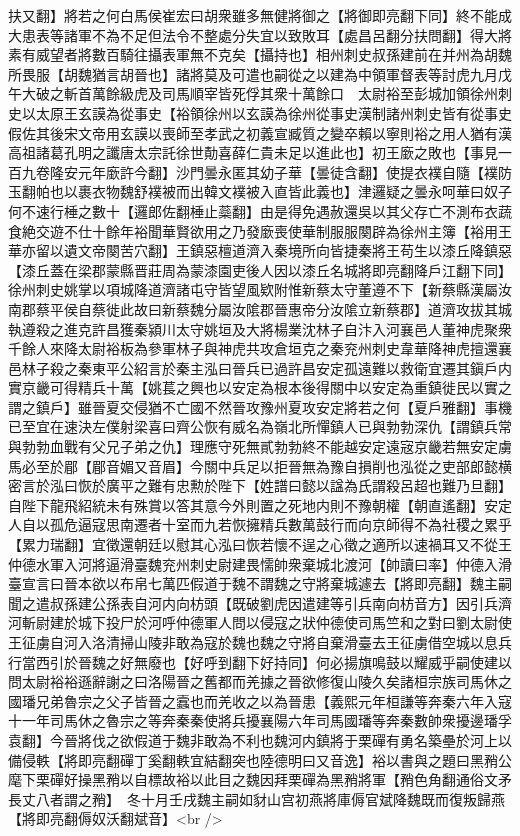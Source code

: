 扶又翻】將若之何白馬侯崔宏曰胡衆雖多無健將御之【將御即亮翻下同】終不能成大患表等諸軍不為不足但法令不整處分失宜以致敗耳【處昌呂翻分扶問翻】得大將素有威望者將數百騎往攝表軍無不克矣【攝持也】相州刺史叔孫建前在并州為胡魏所畏服【胡魏猶言胡晉也】諸將莫及可遣也嗣從之以建為中領軍督表等討虎九月戊午大破之斬首萬餘級虎及司馬順宰皆死俘其衆十萬餘口　太尉裕至彭城加領徐州刺史以太原王玄謨為從事史【裕領徐州以玄謨為徐州從事史漢制諸州刺史皆有從事史假佐其後宋文帝用玄謨以喪師至孝武之初義宣臧質之變卒賴以寧則裕之用人猶有漢高祖諸葛孔明之讖唐太宗託徐世勣喜薛仁貴未足以進此也】初王廞之敗也【事見一百九卷隆安元年廞許今翻】沙門曇永匿其幼子華【曇徒含翻】使提衣襆自隨【襆防玉翻帕也以裹衣物魏舒襆被而出韓文襆被入直皆此義也】津邏疑之曇永呵華曰奴子何不速行棰之數十【邏郎佐翻棰止蘂翻】由是得免遇赦還吳以其父存亡不測布衣蔬食絶交遊不仕十餘年裕聞華賢欲用之乃發廞喪使華制服服闋辟為徐州主簿【裕用王華亦留以遺文帝闋苦穴翻】王鎮惡檀道濟入秦境所向皆捷秦將王苟生以漆丘降鎮惡【漆丘蓋在梁郡蒙縣晋莊周為蒙漆園吏後人因以漆丘名城將即亮翻降戶江翻下同】徐州刺史姚掌以項城降道濟諸屯守皆望風欵附惟新蔡太守董遵不下【新蔡縣漢屬汝南郡蔡平侯自蔡徙此故曰新蔡魏分屬汝隂郡晉惠帝分汝隂立新蔡郡】道濟攻拔其城執遵殺之進克許昌獲秦潁川太守姚垣及大將楊業沈林子自汴入河襄邑人董神虎聚衆千餘人來降太尉裕板為參軍林子與神虎共攻倉垣克之秦兖州刺史韋華降神虎擅還襄邑林子殺之秦東平公紹言於秦主泓曰晉兵已過許昌安定孤遠難以救衛宜遷其鎭戶内實京畿可得精兵十萬【姚萇之興也以安定為根本後得關中以安定為重鎮徙民以實之謂之鎮戶】雖晉夏交侵猶不亡國不然晉攻豫州夏攻安定將若之何【夏戶雅翻】事機已至宜在速決左僕射梁喜曰齊公恢有威名為嶺北所憚鎮人已與勃勃深仇【謂鎮兵常與勃勃血戰有父兄子弟之仇】理應守死無貳勃勃終不能越安定遠宼京畿若無安定虜馬必至於郿【郿音媚又音眉】今關中兵足以拒晉無為豫自損削也泓從之吏部郎懿横密言於泓曰恢於廣平之難有忠勲於陛下【姓譜曰懿以諡為氏謂殺呂超也難乃旦翻】自陛下龍飛紹統未有殊賞以答其意今外則置之死地内則不豫朝權【朝直遙翻】安定人自以孤危逼寇思南遷者十室而九若恢擁精兵數萬鼓行而向京師得不為社稷之累乎【累力瑞翻】宜徵還朝廷以慰其心泓曰恢若懷不逞之心徵之適所以速禍耳又不從王仲德水軍入河將逼滑臺魏兖州刺史尉建畏懦帥衆棄城北渡河【帥讀曰率】仲德入滑臺宣言曰晉本欲以布帛七萬匹假道于魏不謂魏之守將棄城遽去【將即亮翻】魏主嗣聞之遣叔孫建公孫表自河内向枋頭【既破劉虎因遣建等引兵南向枋音方】因引兵濟河斬尉建於城下投尸於河呼仲德軍人問以侵寇之狀仲德使司馬竺和之對曰劉太尉使王征虜自河入洛清掃山陵非敢為寇於魏也魏之守將自棄滑臺去王征虜借空城以息兵行當西引於晉魏之好無廢也【好呼到翻下好持同】何必揚旗鳴鼓以耀威乎嗣使建以問太尉裕裕遜辭謝之曰洛陽晉之舊都而羌據之晉欲修復山陵久矣諸桓宗族司馬休之國璠兄弟魯宗之父子皆晉之蠧也而羌收之以為晉患【義熙元年桓謙等奔秦六年入寇十一年司馬休之魯宗之等奔秦秦使將兵擾襄陽六年司馬國璠等奔秦數帥衆擾邊璠孚袁翻】今晉將伐之欲假道于魏非敢為不利也魏河内鎮將于栗磾有勇名築壘於河上以備侵軼【將即亮翻磾丁奚翻軼宜結翻突也陸德明曰又音逸】裕以書與之題曰黑矟公麾下栗磾好操黑矟以自標故裕以此目之魏因拜栗磾為黑矟將軍【矟色角翻通俗文矛長丈八者謂之矟】　冬十月壬戌魏主嗣如豺山宫初燕將庫傉官斌降魏既而復叛歸燕【將即亮翻傉奴沃翻斌音】<br />
